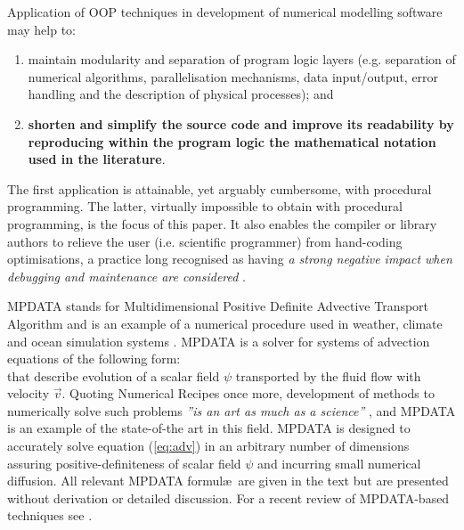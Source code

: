 \documentclass[review,peprint,10pt,5p,times]{elsarticle}
\begin{document}
  Application of OOP techniques in development of numerical modelling software may help to:
  \begin{enumerate}[label=(\roman*), leftmargin=*, widest=ii]
    \item{maintain modularity and separation of program logic layers (e.g. separation of
      numerical algorithms, parallelisation mechanisms, data input/output, error handling and
      the description of physical processes); and}
    \item{{\bf shorten and simplify the source code and improve its readability by reproducing within 
      the program logic the mathematical notation used in the literature}.}
  \end{enumerate}
  The first application is attainable, yet arguably cumbersome, with procedural programming.
  The latter, virtually impossible to obtain with procedural programming, is the focus of this paper.
  It also enables the compiler or library authors to relieve the user (i.e. scientific programmer)
    from hand-coding optimisations, a practice long recognised as having {\em a strong negative impact when debugging
    and maintenance are considered} \citep{Knuth_1974}.

  MPDATA \citep{Smolarkiewicz_1984} stands for Multidimensional Positive Definite Advective Transport Algorithm and is
    an example of a numerical procedure used in weather, climate and ocean simulation systems
    \citep[e.g.][respectively]{Ziemianski_et_al_2011,Abiodun_et_al_2011,Ezer_et_al_2002}.
  MPDATA is a solver for systems of advection equations of the following form:
  \begin{equation}\label{eq:adv}
    
  \end{equation}
  that describe evolution of a scalar field $\psi$ transported by the fluid flow with velocity $\vec{v}$.
  Quoting Numerical Recipes once more, development of methods to numerically solve such problems 
    {\em ''is an art as much as a science''} \citep[][Sec.~20.1]{Press_et_al_2007},
    and MPDATA is an example of the state-of-the art in this field.
  MPDATA is designed to accurately solve equation (\ref{eq:adv}) in an arbitrary
    number of dimensions assuring positive-definiteness of scalar field $\psi$ 
    and incurring small numerical diffusion.
  All relevant MPDATA formul\ae~are given in the text but are presented without
    derivation or detailed discussion.
  For a recent review of MPDATA-based techniques see \citet[][and references therein]{Smolarkiewicz_2006}.
\end{document}
